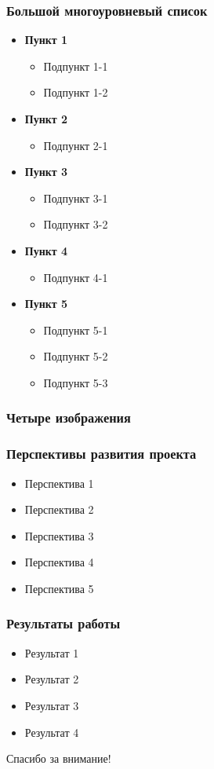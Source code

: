 \documentclass[14pt]{beamer}
\newcommand{\itemi}{\item[\checkmark]}
\begin{document}
\begin{frame}
\frametitle{Большой многоуровневый список}
\begin{itemize}
  \item \textbf{Пункт 1}
    \begin{itemize}
      \itemi Подпункт 1-1
      \itemi Подпункт 1-2
    \end{itemize}
  \item \textbf{Пункт 2}
    \begin{itemize}
      \itemi Подпункт 2-1
    \end{itemize}
  \item \textbf{Пункт 3}
    \begin{itemize}
      \itemi Подпункт 3-1
      \itemi Подпункт 3-2
    \end{itemize}
  \item \textbf{Пункт 4}
    \begin{itemize}
      \itemi Подпункт 4-1
    \end{itemize}
  \item \textbf{Пункт 5}
    \begin{itemize}
      \itemi Подпункт 5-1
      \itemi Подпункт 5-2
      \itemi Подпункт 5-3
    \end{itemize}
\end{itemize}
\end{frame}

\begin{frame}
\frametitle{Четыре изображения}
\begin{figure}[H]
  \centering
\end{figure}
\end{frame}

\begin{frame}
\frametitle{Перспективы развития проекта}
\begin{itemize}
  \item Перспектива 1
  \item Перспектива 2
  \item Перспектива 3
  \item Перспектива 4
  \item Перспектива 5
\end{itemize}
\end{frame}

\begin{frame}
\frametitle{Результаты работы}
\begin{itemize}
  \item Результат 1
  \item Результат 2
  \item Результат 3
  \item Результат 4
\end{itemize}
\end{frame}

\begin{frame}
\begin{center}
Спасибо за внимание!
\end{center}
\end{frame}
\end{document}
